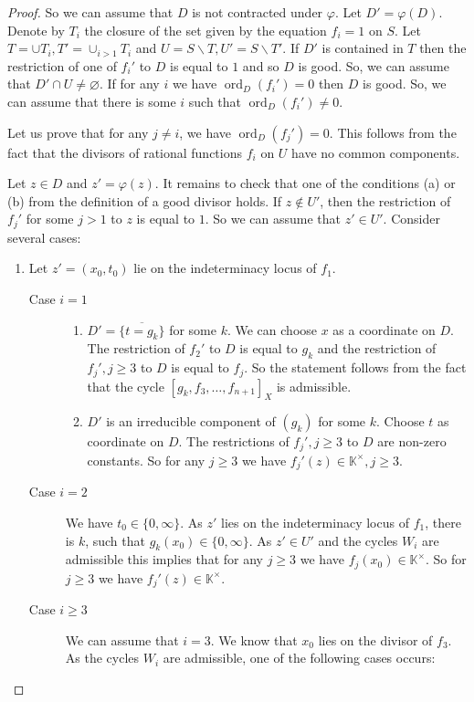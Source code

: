\documentclass[12pt]{extarticle}
\def\mb{\mathbb}
\def\k{\mb K}
\def\ph{\varphi}
\def\t{\times}
\def\ol{\overline}
\def\bs{\backslash}
\DeclareMathOperator{\ord}{ord}
\begin{document}
\begin{proof}
So we can assume that $D$ is not contracted under $\ph$. Let $D'=\ph(D)$. Denote by $T_i$ the closure of the set given by the equation $f_i=1$ on $S$. Let $T=\cup T_i, T'=\cup_{i>1}T_i$ and $U=S\bs T, U'=S\bs T'$. If $D'$ is contained in $T$ then the restriction of one of $f_i'$ to $D$ is equal to $1$ and so $D$ is good. So, we can assume that $D'\cap U\ne\varnothing$. If for any $i$ we have $\ord_D(f_i')=0$ then $D$ is good. So, we can assume that there is some $i$ such that $\ord_D(f_i')\ne 0$.


 Let us prove that for any $j\ne i$, we have $\ord_{D}(f_j')=0$. This follows from the fact that the divisors of rational functions $f_i$ on $U$ have no common components. 

Let $z\in D$ and $z'=\ph(z)$. It remains to check that one of the conditions (a) or (b) from the definition of a good divisor holds. If $z\not\in U'$, then the restriction of $f_j'$ for some $j>1$ to $z$ is equal to $1$. So we can assume that $z'\in U'$. Consider several cases:

\begin{enumerate}
\item Let $z'=(x_0,t_0)$ lie on the indeterminacy locus of $f_1$. 
\begin{description}
\item[Case $i=1$] 
\begin{enumerate}
    \item $D'=\ol{\{t=g_k\}}$ for some $k$. We can choose $x$ as a coordinate on $D$. The restriction of $f_2'$ to $D$ is equal to $g_k$ and the restriction of $f_j',j\geq 3$ to $D$ is equal to $f_j$. So the statement follows from the fact that the cycle $[g_k,f_3,\dots, f_{n+1}]_X$ is admissible.
    \item $D'$ is an irreducible component of $(g_k)$ for some $k$. Choose $t$ as coordinate on $D$. The restrictions of $f_j', j\geq 3$ to $D$ are non-zero constants. So for any $j\geq 3$ we have $f_j'(z)\in\k^\t, j\geq 3$.
\end{enumerate}
    \item[Case $i=2$] We have $t_0\in \{0,\infty\}$. As $z'$ lies on the indeterminacy locus of $f_1$, there is $k$,  such that $g_k(x_0)\in\{0,\infty\}$. As $z'\in U'$ and the cycles $W_i$ are admissible this implies that for any $j\geq 3$ we have $f_j(x_0)\in \k^\t$. So for $j\geq 3$ we have $f_j'(z)\in\k^\t.$
    \item[Case $i\geq 3$] We can assume that $i=3$. We know that $x_0$ lies on the divisor of $f_3$. As the cycles $W_i$ are admissible, one of the following cases occurs:


\end{description}
\end{enumerate}
\end{proof}
\end{document}
